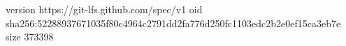version https://git-lfs.github.com/spec/v1
oid sha256:52288937671035f80c4964c2791dd2fa776d250fc1103edc2b2e0ef15ca3eb7e
size 373398
